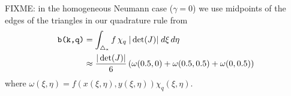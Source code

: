 FIXME: in the homogeneous Neumann case ($\gamma=0$) we use midpoints of the edges of the triangles in our quadrature rule from \citet{Ciarlet2002}
\begin{align*}
\text{\texttt{b(k,q)}} &= \int_{\triangle_\ast} f\, \chi_q \; |\det(J)| \; d\xi \, d\eta \\
  &\approx \frac{|\det(J)|}{6} \left(\omega(0.5,0) + \omega(0.5,0.5) + \omega(0,0.5)\right)
\end{align*}
where $\omega(\xi,\eta) = f(x(\xi,\eta),y(\xi,\eta)) \chi_q(\xi,\eta)$.


\begin{comment}
From: Fande Kong <fdkong.jd@gmail.com>
To: PETSc users list <petsc-users@mcs.anl.gov>
Subject: Re: [petsc-users] Status on parallel mesh reader in DMPlex
> Message: 2
>Date: Fri, 18 Dec 2015 08:21:04 -0800
>From: Justin Chang <jychang48@gmail.com>
>To: petsc-users <petsc-users@mcs.anl.gov>
>Subject: [petsc-users] Status on parallel mesh reader in DMPlex

> Hi all,

>What's the status on the implementation of the parallel

I am actually developing a parallel loader. The loader has two steps:

(1) Use 1 core or several cores to read a sequential  mesh, and partition
it into $np$ parts using a partitioner, $np$ is the number of cores you
want to use to do a simulation. Usually, $np$ is large, for example, 10,000
cores. And then we write the partitioned data into the file system as a
HDF5 file.

(2) Load the partitioned data (HDF5 file) into $np$ cores in parallel.

This idea works pretty well for me at this point.  But, this loader is
not compatible with DMPlex now. However, I could change the code somehow,
If this idea is acceptable.

You could also implement it by yourself. It is not too bad.

>mesh reader/generator for DMPlex meshes? Is anyone actively working on
> this? If so is there a branch that I can peek into?

Parallel generator is highly nontrivial, I think. It is a very hard topic.

> Thanks,
> Justin
\end{comment}


